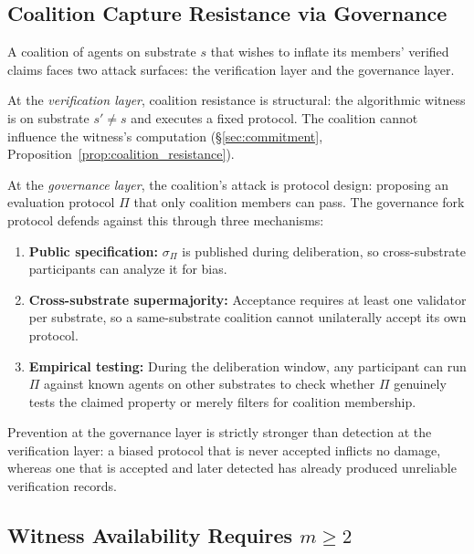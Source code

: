 \subsection{Coalition Capture Resistance via Governance}
\label{sec:coalition_governance}

A coalition of agents on substrate $s$ that wishes to inflate its
members' verified claims faces two attack surfaces: the
verification layer and the governance layer.

At the \emph{verification layer}, coalition resistance is structural:
the algorithmic witness is on substrate $s' \neq s$ and executes a fixed
protocol.  The coalition cannot influence the witness's computation
(\S\ref{sec:commitment}, Proposition~\ref{prop:coalition_resistance}).

At the \emph{governance layer}, the coalition's attack is protocol
design: proposing an evaluation protocol $\Pi$ that only coalition
members can pass.  The governance fork protocol defends against this
through three mechanisms:
\begin{enumerate}
    \item \textbf{Public specification:} $\sigma_\Pi$ is published during
    deliberation, so cross-substrate participants can analyze it for
    bias.
    \item \textbf{Cross-substrate supermajority:}  Acceptance requires
    at least one validator per substrate, so a same-substrate coalition
    cannot unilaterally accept its own protocol.
    \item \textbf{Empirical testing:} During the deliberation window,
    any participant can run $\Pi$ against known agents on other substrates
    to check whether $\Pi$ genuinely tests the claimed property or
    merely filters for coalition membership.
\end{enumerate}

Prevention at the governance layer is strictly stronger than detection
at the verification layer: a biased protocol that is never accepted
inflicts no damage, whereas one that is accepted and later detected has
already produced unreliable verification records.

\subsection{Witness Availability Requires \texorpdfstring{$m \geq 2$}{m >= 2}}
\label{sec:witness_m2}

